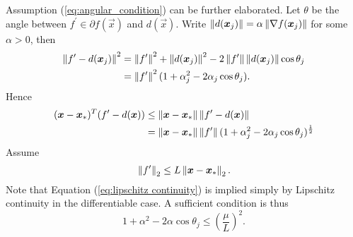 Assumption (\ref{eq:angular_condition}) can be further elaborated.
Let $\theta$ be the angle between $f^\prime \in\partial f(\vec{x})$ and $d(\vec{x})$. Write $\left\Vert d(\boldsymbol{x}_j) \right\Vert = \alpha \left\Vert \nabla f(\boldsymbol{x}_j) \right\Vert$ for some $\alpha>0$,
then
\begin{align}
\left\Vert f^\prime-d(\boldsymbol{x}_j) \right\Vert^2 &= \left\Vert f^\prime \right\Vert^2 + \left\Vert d(\boldsymbol{x}_j) \right\Vert^2 -2\left\Vert f^\prime \right\Vert\left\Vert d(\boldsymbol{x}_j) \right\Vert\cos\theta_j\\
&=  \left\Vert f^\prime \right\Vert^2(1+\alpha_j^2-2\alpha_j \cos\theta_j).
\label{eq:begin_modification_1}
\end{align}
Hence
\begin{align}
(\boldsymbol{x}-\boldsymbol{x}_*)^T (f^\prime -d(\boldsymbol{x})) &\leq \left\Vert \boldsymbol{x}-\boldsymbol{x}_* \right\Vert \left\Vert f^\prime -d(\boldsymbol{x}) \right\Vert\\
&= \left\Vert \boldsymbol{x}-\boldsymbol{x}_* \right\Vert \left\Vert f^\prime \right\Vert(1+\alpha_j^2-2\alpha_j \cos\theta_j)^{\frac{1}{2}}
\end{align}
Assume
\begin{equation}
\left\Vert f^\prime \right\Vert_2\leq L \left\Vert \boldsymbol{x}-\boldsymbol{x}_* \right\Vert_2.
\label{eq:lipschitz continuity}
\end{equation}
Note that Equation (\ref{eq:lipschitz continuity}) is implied simply by Lipschitz continuity in the differentiable case.
A sufficient condition is thus
\begin{equation}
1+\alpha^2-2\alpha \cos\theta_j\leq \left(\frac{\mu}{L}\right)^2.
\label{eq:end_modification_1}
\end{equation}